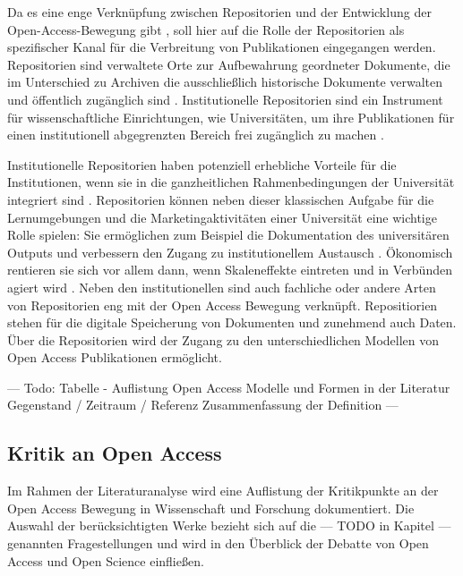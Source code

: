 Da es eine enge Verknüpfung zwischen Repositorien und der Entwicklung der Open-Access-Bewegung gibt \cite{offhaus_2012_institutionelle_repos}, soll hier auf die Rolle der Repositorien als spezifischer Kanal für die Verbreitung von Publikationen eingegangen werden. Repositorien sind verwaltete Orte zur Aufbewahrung geordneter Dokumente, die im Unterschied zu Archiven die ausschließlich historische Dokumente verwalten und öffentlich zugänglich sind \cite{suchen}. Institutionelle Repositorien sind ein Instrument für wissenschaftliche Einrichtungen, wie Universitäten, um ihre Publikationen für einen institutionell abgegrenzten Bereich frei zugänglich zu machen \cite{dobratz_2007_open}.

Institutionelle Repositorien haben potenziell erhebliche Vorteile für die Institutionen, wenn sie in die ganzheitlichen Rahmenbedingungen der Universität integriert sind \cite{steele_2006}. Repositorien können neben dieser klassischen Aufgabe für die Lernumgebungen und die Marketingaktivitäten einer Universität eine wichtige Rolle spielen: Sie ermöglichen zum Beispiel die Dokumentation des universitären Outputs und verbessern den Zugang zu institutionellem Austausch \cite{steele_2006}. Ökonomisch rentieren sie sich vor allem dann, wenn Skaleneffekte eintreten und in Verbünden agiert wird \cite{blythe_2005value}. Neben den institutionellen sind auch fachliche oder andere Arten von Repositorien eng mit der Open Access Bewegung verknüpft. Repositiorien stehen  für die digitale Speicherung von Dokumenten und zunehmend auch Daten. Über die Repositorien wird der Zugang zu den unterschiedlichen Modellen von Open Access Publikationen ermöglicht.

--- Todo: Tabelle - Auflistung Open Access  Modelle und Formen in der Literatur
Gegenstand / Zeitraum / Referenz
Zusammenfassung der Definition ---

\subsection{Kritik an Open Access}

Im Rahmen der Literaturanalyse wird eine Auflistung der Kritikpunkte an der Open Access Bewegung in Wissenschaft und Forschung dokumentiert. Die Auswahl der berücksichtigten Werke bezieht sich auf die --- TODO in Kapitel --- genannten Fragestellungen und wird in den Überblick der Debatte von Open Access und Open Science einfließen.

